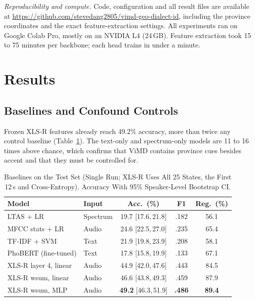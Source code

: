 \documentclass[conference]{IEEEtran}
\newcommand{\ci}[2]{\scriptsize[#1,\,#2]}
\begin{document}
\textit{Reproducibility and compute.} Code, configuration and all result files are available at \url{https://github.com/stevedang2805/vimd-geo-dialect-id}, including the province coordinates and the exact feature-extraction settings. All experiments ran on Google Colab Pro, mostly on an NVIDIA L4 (24\,GB). Feature extraction took 15 to 75 minutes per backbone; each head trains in under a minute.

\section{Results}

\subsection{Baselines and Confound Controls}
Frozen XLS-R features already reach 49.2\% accuracy, more than twice any control baseline (Table~\ref{tab:baselines}). The text-only and spectrum-only models are 11 to 16 times above chance, which confirms that ViMD contains province cues besides accent and that they must be controlled for.

\begin{table}[t]
\centering
\caption{Baselines on the Test Set (Single Run; XLS-R Uses All 25 States, the First 12\,s and Cross-Entropy). Accuracy With 95\% Speaker-Level Bootstrap CI.}
\label{tab:baselines}
\setlength{\tabcolsep}{3pt}
\begin{tabular}{@{}llccc@{}}
\toprule
Model & Input & Acc.\ (\%) & F1 & Reg.\ (\%) \\
\midrule
LTAS + LR & Spectrum & 19.7 \ci{17.6}{21.8} & .182 & 56.1 \\
MFCC stats + LR & Audio & 24.6 \ci{22.5}{27.0} & .235 & 65.4 \\
TF-IDF + SVM & Text & 21.9 \ci{19.8}{23.9} & .208 & 58.1 \\
PhoBERT (fine-tuned) & Text & 17.8 \ci{15.8}{19.9} & .133 & 67.1 \\
\midrule
XLS-R layer 4, linear & Audio & 44.9 \ci{42.0}{47.6} & .443 & 84.5 \\
XLS-R wsum, linear & Audio & 46.6 \ci{43.8}{49.3} & .459 & 87.9 \\
XLS-R wsum, MLP & Audio & \textbf{49.2} \ci{46.3}{51.9} & \textbf{.486} & \textbf{89.4} \\
\bottomrule
\end{tabular}
\end{table}
\end{document}
